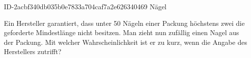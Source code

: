 \begin{exercise}
      {ID-2acbf340db035b0e7833a704caf7a2e626340469}
      {Nägel}
  \ifproblem\problem\par
    Ein Hersteller garantiert, dass unter 50 Nägeln einer Packung höchstens zwei
    die geforderte Mindestlänge nicht besitzen. Man zieht nun zufällig einen
    Nagel aus der Packung. Mit welcher Wahrscheinlichkeit ist er zu kurz, wenn
    die Angabe des Herstellers zutrifft?
  \fi
\end{exercise}
